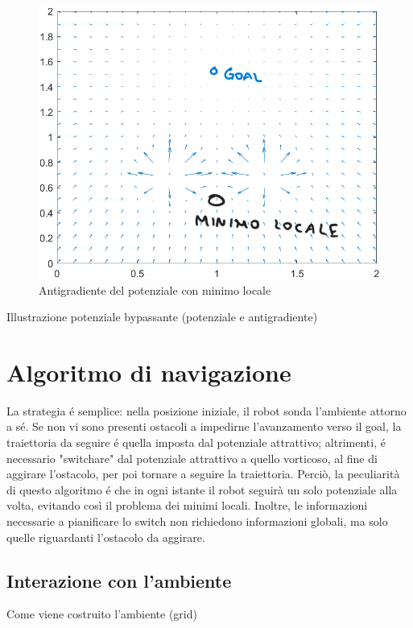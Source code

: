 \documentclass[14pt,twoside,a4paper]{extarticle}
\begin{document}
\begin{figure}[H]
\caption{Antigradiente del potenziale con minimo locale}
\label{antiminloc}
\includegraphics[width=\textwidth]{antigradMinimoLocale.png}
\end{figure}

Illustrazione potenziale bypassante (potenziale e antigradiente)

\section{Algoritmo di navigazione\cite{dalfonso}} 
La strategia é semplice: nella posizione iniziale, il robot sonda l'ambiente attorno a sé. Se non vi sono presenti ostacoli a impedirne l'avanzamento verso il goal, la traiettoria da seguire é quella imposta dal potenziale attrattivo; altrimenti, é necessario "switchare" dal potenziale attrattivo a quello vorticoso, al fine di aggirare l'ostacolo, per poi tornare a seguire la traiettoria. Perciò, la peculiarità di questo algoritmo é che in ogni istante il robot seguirà un solo potenziale alla volta, evitando così il problema dei minimi locali. Inoltre, le informazioni necessarie a pianificare lo switch non richiedono informazioni globali, ma solo quelle riguardanti l'ostacolo da aggirare.

\subsection{Interazione con l'ambiente}
Come viene costruito l'ambiente (grid)\\
\end{document}
